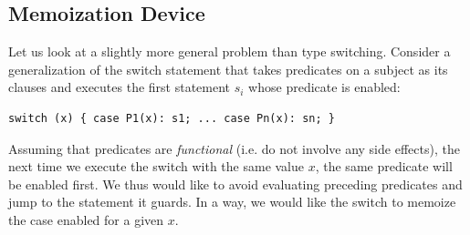 %

\subsection{Memoization Device}
\label{sec:memdev}

Let us look at a slightly more general problem than type switching. Consider a 
generalization of the switch statement that takes predicates on a subject as its 
clauses and executes the first statement $s_i$ whose predicate is enabled: 

\begin{lstlisting}[keepspaces]
switch (x) { case P1(x): s1; ... case Pn(x): sn; }
\end{lstlisting}

\noindent
Assuming that predicates are \emph{functional} (i.e. do not involve any side 
effects), the next time we execute the switch with the same value $x$, the same 
predicate will be enabled first. We thus would like to avoid evaluating 
preceding predicates and jump to the statement it guards. In a way, we 
would like the switch to memoize the case enabled for a given $x$. 

